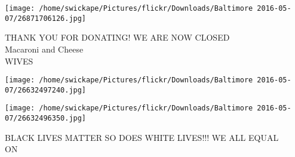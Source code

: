 \documentclass[10pt,letterpaper]{article}
\begin{document}
\vspace{0.25in}
\texttt{[image: /home/swickape/Pictures/flickr/Downloads/Baltimore 2016-05-07/26871706126.jpg]}

THANK YOU FOR DONATING!  WE ARE NOW CLOSED\\
Macaroni and Cheese\\
WIVES\\
\pagebreak

\texttt{[image: /home/swickape/Pictures/flickr/Downloads/Baltimore 2016-05-07/26632497240.jpg]}

\vspace{0.25in}
\texttt{[image: /home/swickape/Pictures/flickr/Downloads/Baltimore 2016-05-07/26632496350.jpg]}

BLACK LIVES MATTER SO DOES WHITE LIVES!!! WE ALL EQUAL\\
ON\\
\pagebreak
\end{document}
